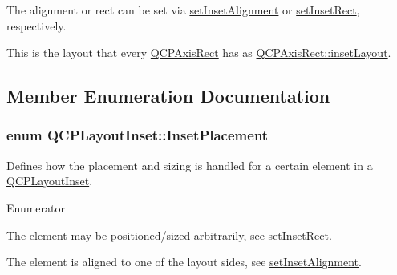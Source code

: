 The alignment or rect can be set via \hyperlink{classQCPLayoutInset_a62882a4f9ad58bb0f53da12fde022abe}{set\+Inset\+Alignment} or \hyperlink{classQCPLayoutInset_aa487c8378a6f9533567a2e6430099dc3}{set\+Inset\+Rect}, respectively.

This is the layout that every \hyperlink{classQCPAxisRect}{Q\+C\+P\+Axis\+Rect} has as \hyperlink{classQCPAxisRect_a4114887c7141b59650b7488f930993e5}{Q\+C\+P\+Axis\+Rect\+::inset\+Layout}. 

\subsection{Member Enumeration Documentation}
\subsubsection[{\texorpdfstring{Inset\+Placement}{InsetPlacement}}]{\setlength{\rightskip}{0pt plus 5cm}enum {\bf Q\+C\+P\+Layout\+Inset\+::\+Inset\+Placement}}\hypertarget{classQCPLayoutInset_a8b9e17d9a2768293d2a7d72f5e298192}{}\label{classQCPLayoutInset_a8b9e17d9a2768293d2a7d72f5e298192}
Defines how the placement and sizing is handled for a certain element in a \hyperlink{classQCPLayoutInset}{Q\+C\+P\+Layout\+Inset}. \begin{Desc}
\item[Enumerator]\par
\begin{description}
\item[{\em 
ip\+Free\hypertarget{classQCPLayoutInset_a8b9e17d9a2768293d2a7d72f5e298192aa4802986ea2cea457f932b115acba59e}{}\label{classQCPLayoutInset_a8b9e17d9a2768293d2a7d72f5e298192aa4802986ea2cea457f932b115acba59e}
}]The element may be positioned/sized arbitrarily, see \hyperlink{classQCPLayoutInset_aa487c8378a6f9533567a2e6430099dc3}{set\+Inset\+Rect}. \item[{\em 
ip\+Border\+Aligned\hypertarget{classQCPLayoutInset_a8b9e17d9a2768293d2a7d72f5e298192aa81e7df4a785ddee2229a8f47c46e817}{}\label{classQCPLayoutInset_a8b9e17d9a2768293d2a7d72f5e298192aa81e7df4a785ddee2229a8f47c46e817}
}]The element is aligned to one of the layout sides, see \hyperlink{classQCPLayoutInset_a62882a4f9ad58bb0f53da12fde022abe}{set\+Inset\+Alignment}. \end{description}
\end{Desc}


